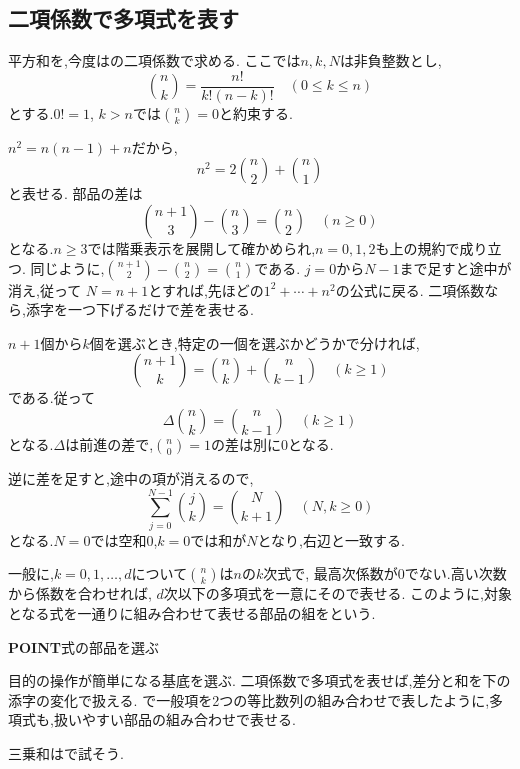 \subsection{二項係数で多項式を表す}\label{節：二項係数で多項式を表す}
平方和を,今度はの二項係数で求める.
ここでは$n,k,N$は非負整数とし,
\[
  \binom nk=\frac{n!}{k!(n-k)!}\quad(0\le k\le n)
\]
とする.$0!=1$, $k>n$では$\binom nk=0$と約束する.

$n^2=n(n-1)+n$だから,
\[
  n^2=2\binom n2+\binom n1
\]
と表せる.
部品の差は
\[
  \binom{n+1}{3}-\binom n3=\binom n2\quad(n\ge0)
\]
となる.$n\ge3$では階乗表示を展開して確かめられ,$n=0,1,2$も上の規約で成り立つ.
同じように,$\binom{n+1}{2}-\binom n2=\binom n1$である.
$j=0$から$N-1$まで足すと途中が消え,従って
\BookMathLayout{\[
    \sum_{j=0}^{N-1}j^2=2\binom N3+\binom N2
    =\frac{N(N-1)(2N-1)}6.
  \]}{\[
    \begin{aligned}
      \sum_{j=0}^{N-1}j^2&=2\binom N3+\binom N2\\
      &=\frac{N(N-1)(2N-1)}6.
    \end{aligned}
  \]}
$N=n+1$とすれば,先ほどの$1^2+\cdots+n^2$の公式に戻る.
二項係数なら,添字を一つ下げるだけで差を表せる.

$n+1$個から$k$個を選ぶとき,特定の一個を選ぶかどうかで分ければ,
\[
  \binom{n+1}{k}=\binom nk+\binom n{k-1}\quad(k\ge1)
\]
である.従って
\[
  \Delta\binom nk=\binom n{k-1}\quad(k\ge1)
\]
となる.$\Delta$は前進の差で,$\binom n0=1$の差は別に0となる.

逆に差を足すと,途中の項が消えるので,
\[
  \sum_{j=0}^{N-1}\binom jk=\binom N{k+1}
  \quad(N,k\ge0)
\]
となる.$N=0$では空和$0$,$k=0$では和が$N$となり,右辺と一致する.
\BookFigBinomialDifference

一般に,$k=0,1,\ldots,d$について$\binom nk$は$n$の$k$次式で,
最高次係数が0でない.高い次数から係数を合わせれば,
$d$次以下の多項式を一意にそので表せる.
このように,対象となる式を一通りに組み合わせて表せる部品の組をという.
\begin{bookpoint}
  \textbf{POINT}\quad 式の部品を選ぶ\par
  目的の操作が簡単になる基底を選ぶ.
  二項係数で多項式を表せば,差分と和を下の添字の変化で扱える.
  で一般項を2つの等比数列の組み合わせで表したように,多項式も,扱いやすい部品の組み合わせで表せる.
\end{bookpoint}
三乗和はで試そう.
